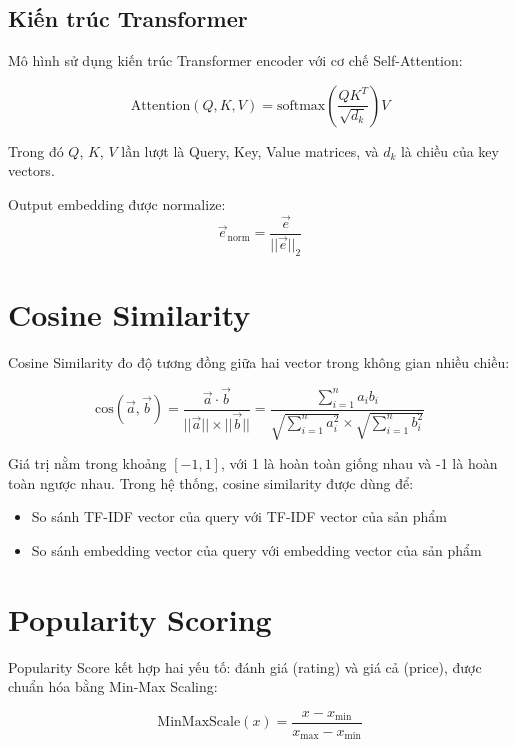 \documentclass[12pt,a4paper]{report}
\begin{document}
\subsection{Kiến trúc Transformer}

Mô hình sử dụng kiến trúc Transformer encoder với cơ chế Self-Attention:

\begin{equation}
\text{Attention}(Q, K, V) = \text{softmax}\left(\frac{QK^T}{\sqrt{d_k}}\right)V
\end{equation}

Trong đó $Q$, $K$, $V$ lần lượt là Query, Key, Value matrices, và $d_k$ là chiều của key vectors.

Output embedding được normalize:
\begin{equation}
\vec{e}_{\text{norm}} = \frac{\vec{e}}{||\vec{e}||_2}
\end{equation}

\section{Cosine Similarity}

Cosine Similarity đo độ tương đồng giữa hai vector trong không gian nhiều chiều:

\begin{equation}
\text{cos}(\vec{a}, \vec{b}) = \frac{\vec{a} \cdot \vec{b}}{||\vec{a}|| \times ||\vec{b}||} = \frac{\sum_{i=1}^{n} a_i b_i}{\sqrt{\sum_{i=1}^{n} a_i^2} \times \sqrt{\sum_{i=1}^{n} b_i^2}}
\end{equation}

Giá trị nằm trong khoảng $[-1, 1]$, với 1 là hoàn toàn giống nhau và -1 là hoàn toàn ngược nhau. Trong hệ thống, cosine similarity được dùng để:
\begin{itemize}
    \item So sánh TF-IDF vector của query với TF-IDF vector của sản phẩm
    \item So sánh embedding vector của query với embedding vector của sản phẩm
\end{itemize}

\section{Popularity Scoring}

Popularity Score kết hợp hai yếu tố: đánh giá (rating) và giá cả (price), được chuẩn hóa bằng Min-Max Scaling:

\begin{equation}
\text{MinMaxScale}(x) = \frac{x - x_{\min}}{x_{\max} - x_{\min}}
\end{equation}
\end{document}

